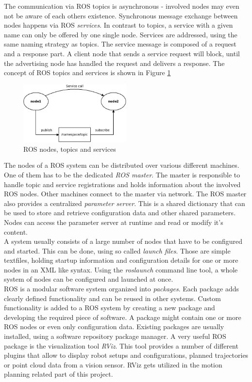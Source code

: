 The communication via ROS topics is asynchronous - involved nodes may even not be aware of each others existence. Synchronous message exchange between nodes happens via ROS \emph{services}. In contrast to topics, a service with a given name can only be offered by one single node. Services are addressed, using the same naming strategy as topics. The service message is composed of a request and a response part. A client node that sends a service request will block, until the advertising node has handled the request and delivers a response. The concept of ROS topics and services is shown in Figure \ref{fig:ros_concept}
\begin{figure}[h]
	\centering
  \includegraphics[width=0.5\textwidth]{images/ros_concept.jpg}
	\caption{ROS nodes, topics and services}
	\label{fig:ros_concept}
\end{figure}

The nodes of a ROS system can be distributed over various different machines. One of them has to be the dedicated \emph{ROS master}. The master is responsible to handle topic and service registrations and holds information about the involved ROS nodes. Other machines connect to the master via network. The ROS master also provides a centralized \emph{parameter server}. This is a shared dictionary that can be used to store and retrieve configuration data and other shared parameters. Nodes can access the parameter server at runtime and read or modify it's content. \\

A system usually consists of a large number of nodes that have to be configured and started. This can be done, using so called \emph{launch files}. Those are simple textfiles, holding startup information and configuration details for one or more nodes in an XML like syntax. Using the \emph{roslaunch} command line tool, a whole system of nodes can be configured and launched at once. \\

ROS is a modular software system organized into \emph{packages}. Each package adds clearly defined functionality and can be reused in other systems. Custom functionality is added to a ROS system by creating a new package and developing the required piece of software. A package might contain one or more ROS nodes or even only configuration data. Existing packages are usually installed, using a software repository package manager. A very useful ROS package is the visualization tool \emph{RViz}. This tool provides a number of different plugins that allow to display robot setups and configurations, planned trajectories or point cloud data from a vision sensor. RViz gets utilized in the motion planning related part of this project.

